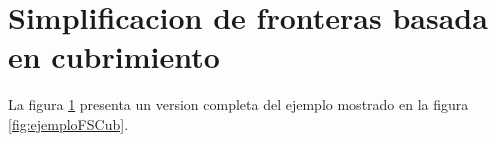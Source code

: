 \section{Simplificacion de fronteras basada en cubrimiento}\label{EXE:sfbc}
\begingroup
\small
La figura \ref{EXE:sfbc} presenta un version completa del ejemplo mostrado en la figura \ref{fig:ejemploFSCub}.
\endgroup
\begin{figure}[H]
  \centerfloat


\end{figure}

